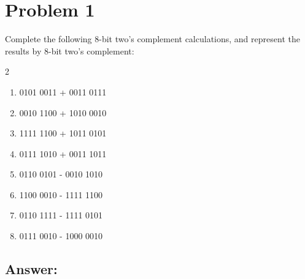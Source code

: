 
\section*{Problem 1}

Complete the following 8-bit two's complement calculations, and represent the results by 8-bit two's complement:

\begin{multicols}{2}
    \begin{enumerate}
        \item 0101 0011 + 0011 0111
        \item 0010 1100 + 1010 0010
        \item 1111 1100 + 1011 0101
        \item 0111 1010 + 0011 1011
        \item 0110 0101 - 0010 1010
        \item 1100 0010 - 1111 1100
        \item 0110 1111 - 1111 0101
        \item 0111 0010 - 1000 0010
    \end{enumerate}
\end{multicols}

\subsection*{Answer:}
